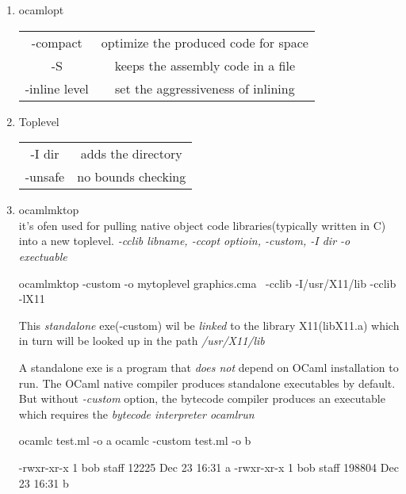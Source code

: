 \begin{enumerate}
\item ocamlopt   \\
  \begin{tabular}{|c|c|}
    -compact & optimize the produced code for space \\
    -S & keeps the assembly code in a file \\
    -inline level & set the aggressiveness of inlining \\
  \end{tabular}

\item Toplevel
  \begin{tabular}{|c|c|}
    -I dir & adds the directory \\
    -unsafe & no bounds checking \\
  \end{tabular}
\item ocamlmktop \\
  it's ofen used for pulling native object code libraries(typically written in C) into
  a new toplevel.
  \textit{
    -cclib libname, -ccopt optioin, -custom, -I dir -o exectuable
  }

  \begin{bluetext}
    ocamlmktop -custom -o mytoplevel graphics.cma \
    -cclib -I/usr/X11/lib -cclib -lX11
  \end{bluetext}
  
  This \textit{standalone} exe(-custom) wil be \textit{linked} to the library X11(libX11.a) which in turn will be looked up in the path \textit{/usr/X11/lib}

  A standalone exe is a program that \textit{does not } depend on OCaml installation to run.
  The OCaml native compiler produces standalone executables by default. But without \textit{-custom} option, the bytecode compiler produces an executable which requires the \textit{bytecode interpreter ocamlrun}

  \begin{ocamlcode}
ocamlc test.ml -o a
ocamlc -custom test.ml -o b
\end{ocamlcode}

\begin{ocamlcode}
-rwxr-xr-x   1 bob  staff    12225 Dec 23 16:31 a
-rwxr-xr-x   1 bob  staff   198804 Dec 23 16:31 b
\end{ocamlcode}



\end{enumerate}
